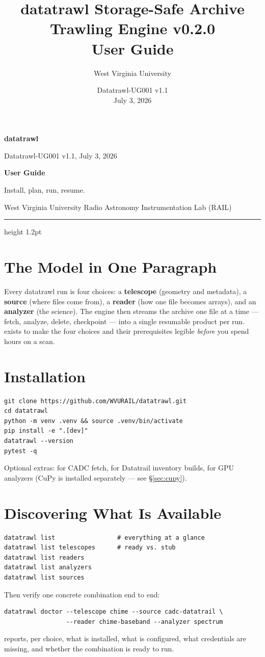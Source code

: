 \documentclass[10pt,letterpaper]{article}
\title{datatrawl Storage-Safe Archive Trawling Engine v0.2.0\\User Guide}
\author{West Virginia University}
\date{Datatrawl-UG001 v1.1 \\ July 3, 2026}
\newcommand{\code}[1]{\texttt{\detokenize{#1}}}
\begin{document}
\thispagestyle{fancy}
{\sffamily
\begin{minipage}[t]{0.39\textwidth}
  {\fontsize{24}{26}\selectfont\bfseries\color{TrawlAmber}datatrawl}\par
  {\small Datatrawl-UG001 v1.1, July 3, 2026}
\end{minipage}%
\begin{minipage}[t]{0.61\textwidth}
  \raggedleft
  {\large\bfseries User Guide}\par
  {\small Install, plan, run, resume.}\par
  {\small West Virginia University Radio Astronomy Instrumentation Lab (RAIL)}
\end{minipage}
}
\vspace{6pt}
{\color{TrawlAmber}\hrule height 1.2pt}
\vspace{8pt}

\section{The Model in One Paragraph}
Every datatrawl run is four choices: a \textbf{telescope} (geometry and
metadata), a \textbf{source} (where files come from), a \textbf{reader} (how
one file becomes arrays), and an \textbf{analyzer} (the science). The engine
then streams the archive one file at a time --- fetch, analyze, delete,
checkpoint --- into a single resumable product per run. \code{datatrawl
doctor} exists to make the four choices and their prerequisites legible
\emph{before} you spend hours on a scan.

\section{Installation}
\begin{lstlisting}
git clone https://github.com/WVURAIL/datatrawl.git
cd datatrawl
python -m venv .venv && source .venv/bin/activate
pip install -e ".[dev]"
datatrawl --version
pytest -q
\end{lstlisting}
Optional extras: \code{[cadc]} for CADC fetch, \code{[survey]} for Datatrail
inventory builds, \code{[gpu]} for GPU analyzers (CuPy is installed separately
--- see \S\ref{sec:cupy}).

\section{Discovering What Is Available}
\begin{lstlisting}
datatrawl list                 # everything at a glance
datatrawl list telescopes      # ready vs. stub
datatrawl list readers
datatrawl list analyzers
datatrawl list sources
\end{lstlisting}
Then verify one concrete combination end to end:
\begin{lstlisting}
datatrawl doctor --telescope chime --source cadc-datatrail \
                 --reader chime-baseband --analyzer spectrum
\end{lstlisting}
\code{doctor} reports, per choice, what is installed, what is configured, what
credentials are missing, and whether the combination is ready to run.
\end{document}
